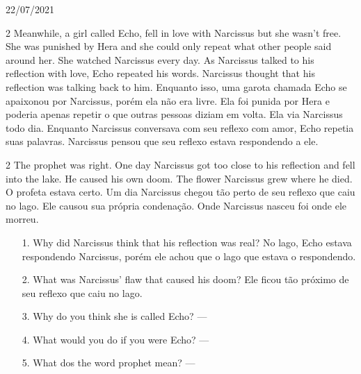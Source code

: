 \documentclass{SchoolBook}
\begin{document}
    \begin{day}{22/07/2021}
        \begin{multicols} 2
            Meanwhile, a girl called Echo, fell in love with Narcissus but she wasn't free. She was punished by Hera and she could only repeat what other people said around her. She watched Narcissus every day. As Narcissus talked to his reflection with love, Echo repeated his words. Narcissus thought that his reflection was talking back to him.
            \cbreak
            Enquanto isso, uma garota chamada Echo se apaixonou por Narcissus, porém ela não era livre. Ela foi punida por Hera e poderia apenas repetir o que outras pessoas diziam em volta. Ela via Narcissus todo dia. Enquanto Narcissus conversava com seu reflexo com amor, Echo repetia suas palavras. Narcissus pensou que seu reflexo estava respondendo a ele.
        \end{multicols}
        
        \begin{multicols} 2
            The prophet was right. One day Narcissus got too close to his reflection and fell into the lake. He caused his own doom. The flower Narcissus grew where he died.
            \cbreak
            O profeta estava certo. Um dia Narcissus chegou tão perto de seu reflexo que caiu no lago. Ele causou sua própria condenação. Onde Narcissus nasceu foi onde ele morreu.
        \end{multicols}
        
        \begin{enumerate}
            \item[1.] Why did Narcissus think that his reflection was real?
            \response No lago, Echo estava respondendo Narcissus, porém ele achou que o lago que estava o respondendo.
            
            \item[2.] What was Narcissus' flaw that caused his doom?
            \response Ele ficou tão próximo de seu reflexo que caiu no lago.
            
            \item[3.] Why do you think she is called Echo?
            \response ---
            
            \item[4.] What would you do if you were Echo?
            \response ---
            
            \item[5.] What dos the word prophet mean?
            \response ---
        \end{enumerate}
    \end{day}
    
\end{document}

